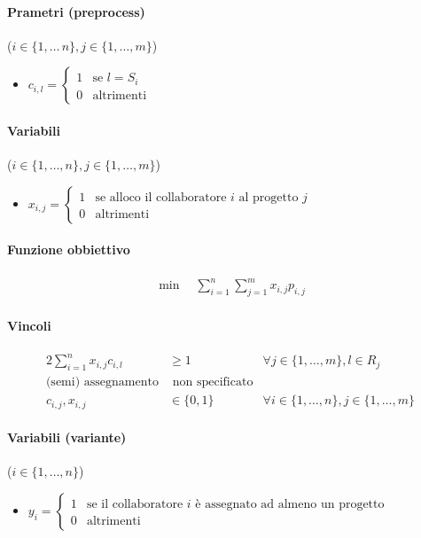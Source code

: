 \documentclass{article}
\begin{document}
\paragraph{Prametri (preprocess)} ($i \in \{1,\ldots\,n\}, j \in \{1,\ldots,m\}$)
\begin{itemize}
  \item $c_{i,l} = \begin{cases}
      1 & \text{se }l = S_i \\
      0 & \text{altrimenti}
  \end{cases}$
\end{itemize}

\paragraph{Variabili} ($i \in \{1,\ldots,n\}, j \in \{1,\ldots,m\}$)
\begin{itemize}
  \item $x_{i,j} = \begin{cases}
    1 &\text{se alloco il collaboratore }i\text{ al progetto }j\\
    0 &\text{altrimenti}
  \end{cases}$
\end{itemize}

\paragraph{Funzione obbiettivo}
\begin{align*}
  \min \quad \sum_{i=1}^n \sum_{j=1}^m x_{i,j} p_{i,j}
\end{align*}

\paragraph{Vincoli}
\begin{alignat}{2}
  \sum_{i=1}^n x_{i,j} c_{i,l} &\geq 1 &\forall j \in \{1,\ldots,m\}, l \in R_j\\
  \text{(semi) assegnamento} &\text{ non specificato}&\\
  c_{i,j}, x_{i,j} &\in \{0,1\} \quad &\forall i \in \{1,\ldots,n\}, j \in \{1,\ldots,m\}
\end{alignat}

\paragraph{Variabili (variante)} ($i \in \{1,\ldots,n\}$)
\begin{itemize}
  \item $y_i = \begin{cases}
    1 &\text{se il collaboratore }i\text{ \`e assegnato ad almeno un progetto}\\
    0 &\text{altrimenti}
  \end{cases}$
\end{itemize}
\end{document}
